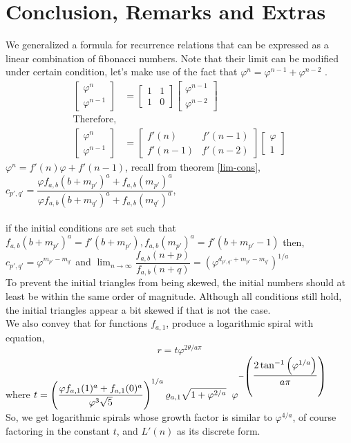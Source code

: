 \documentclass[preprint,12pt]{elsarticle}
\begin{document}
\section{Conclusion, Remarks and Extras}
We generalized a formula for recurrence relations that can be expressed as a linear combination of fibonacci numbers. Note that their limit can be modified under certain condition, let's make use of the fact that $\varphi^n = \varphi^{n-1}+\varphi^{n-2}$ \cite{Powerp}.\\
\begin{align*}
\begin{bmatrix}\varphi^n \\\varphi^{n-1}\end{bmatrix}
&=
\begin{bmatrix}1 & 1\\1 & 0\end{bmatrix}
\begin{bmatrix}\varphi^{n-1}\\\varphi^{n-2}\end{bmatrix}\\
\text{Therefore,}\\
\begin{bmatrix}\varphi^n \\\varphi^{n-1}\end{bmatrix}
&=
\begin{bmatrix}f'(n) & f'(n-1)\\f'(n-1) & f'(n-2)\end{bmatrix}
\begin{bmatrix}\varphi\\1\end{bmatrix}
\end{align*}
$\varphi^n = f'(n)\varphi+f'(n-1)$, recall from theorem \ref{lim-cons}, $c_{p',q'} = \dfrac{\varphi f_{a,b}(b+m_{p'})^a + f_{a,b}(m_{p'})^a}{\varphi f_{a,b}(b+m_{q'})^a + f_{a,b}(m_{q'})^a}$,\\\\
if the initial conditions are set such that $f_{a,b}(b+m_{p'})^a =f'(b+m_{p'}), f_{a,b}(m_{p'})^a = f'(b+m_{p'} -1)$ then, $c_{p',q'} = \varphi^{m_{p'}-m_{q'}}$ and $\lim_{n \to \infty} \dfrac{f_{a,b}(n + p)}{f_{a,b}(n + q)} = \left(\varphi^{d_{p',q'}+m_{p'}-m_{q'}}\right)^{1/a}$\\
To prevent the initial triangles from being skewed, the initial numbers should at least be within the same order of magnitude. Although all conditions still hold, the initial triangles appear a bit skewed if that is not the case.\\
We also convey that for functions $f_{a,1}$, produce a logarithmic spiral with equation, $$r = t\varphi^{2\theta/a\pi}$$ where $t=\left(\dfrac{\varphi f_{a,1}(1)^a+f_{a,1}(0)^a}{\varphi^{3}\sqrt{5}}\right)^{1/a}\varrho_{a,1}\sqrt{1 + \varphi^{2/a}}\hspace{2mm}\varphi^{-\left(\dfrac{ 2\tan^{-1}{\left(\varphi^{1/a}\right)}}{a\pi}\right)}$\\
So, we get logarithmic spirals whose growth factor is similar to $\varphi^{4/a}$, of course factoring in the constant $t$, and $L'(n)$ as its discrete form.\\




\end{document}
